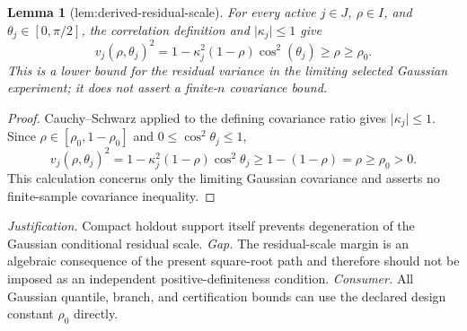\documentclass{article}
\newtheorem{lemma}{Lemma}
\begin{document}
\begin{lemma}[lem:derived-residual-scale]\label{lem:derived-residual-scale}
For every active \(j\in J\), \(\rho\in I\), and \(\theta_j\in[0,\pi/2]\), the correlation definition and \(\lvert\kappa_j\rvert\le1\) give \[v_j(\rho,\theta_j)^2=1-\kappa_j^2(1-\rho)\cos^2(\theta_j)\ge\rho\ge\rho_0.\] This is a lower bound for the residual variance in the limiting selected Gaussian experiment; it does not assert a finite-\(n\) covariance bound.
\end{lemma}
\begin{proof}
Cauchy--Schwarz applied to the defining covariance ratio gives \(\lvert\kappa_j\rvert\le1\).  Since \(\rho\in[\rho_0,1-\rho_0]\) and \(0\le\cos^2\theta_j\le1\),
\[
v_j(\rho,\theta_j)^2
=1-\kappa_j^2(1-\rho)\cos^2\theta_j
\ge1-(1-\rho)=\rho\ge\rho_0>0.
\]
This calculation concerns only the limiting Gaussian covariance and asserts no finite-sample covariance inequality.
\end{proof}
\par\smallskip\noindent \textit{Justification.} Compact holdout support itself prevents degeneration of the Gaussian conditional residual scale. \textit{Gap.} The residual-scale margin is an algebraic consequence of the present square-root path and therefore should not be imposed as an independent positive-definiteness condition. \textit{Consumer.} All Gaussian quantile, branch, and certification bounds can use the declared design constant \(\rho_0\) directly.
\end{document}
